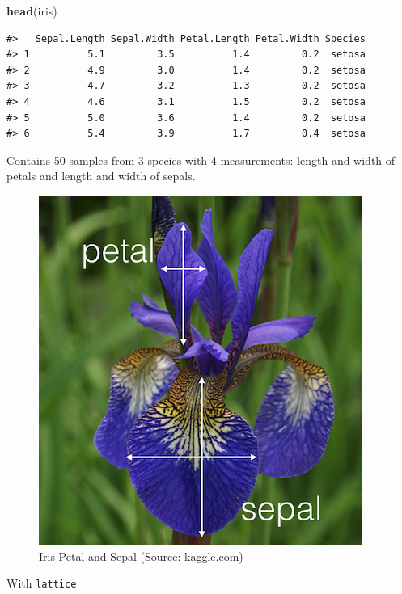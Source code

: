 \documentclass[]{book}
\newenvironment{Shaded}{\begin{snugshade}}{\end{snugshade}}
\newcommand{\KeywordTok}[1]{\textcolor[rgb]{0.13,0.29,0.53}{\textbf{#1}}}
\newcommand{\NormalTok}[1]{#1}
\theoremstyle{definition}
\theoremstyle{definition}
\theoremstyle{definition}
\theoremstyle{remark}
\begin{document}
\begin{Shaded}
\begin{Highlighting}[]
\KeywordTok{head}\NormalTok{(iris)}
\end{Highlighting}
\end{Shaded}

\begin{verbatim}
#>   Sepal.Length Sepal.Width Petal.Length Petal.Width Species
#> 1          5.1         3.5          1.4         0.2  setosa
#> 2          4.9         3.0          1.4         0.2  setosa
#> 3          4.7         3.2          1.3         0.2  setosa
#> 4          4.6         3.1          1.5         0.2  setosa
#> 5          5.0         3.6          1.4         0.2  setosa
#> 6          5.4         3.9          1.7         0.4  setosa
\end{verbatim}

Contains 50 samples from 3 species with 4 measurements: length and width
of petals and length and width of sepals.

\begin{figure}
\includegraphics[width=0.3\linewidth]{img/iris_petal_sepal} \caption{Iris Petal and Sepal (Source: kaggle.com)}\label{fig:iris-photo}
\end{figure}

With \texttt{lattice}
\end{document}
